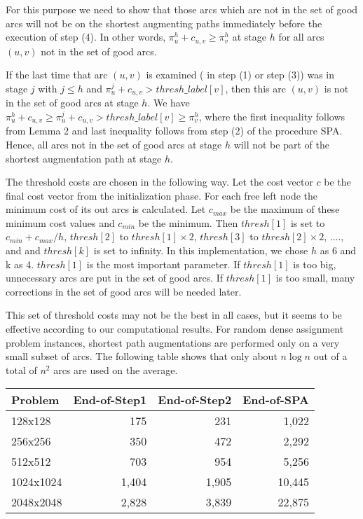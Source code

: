 For this purpose we need to show that those arcs which are not in the
set of good arcs will not be on the shortest augmenting paths
immediately before the execution of step (4). In other words, $\pi^h_u
+ c_{u,v} \geq \pi^h_v$ at stage $h$ for all arcs $(u,v)$ not in the
set of good arcs.

If the last time that arc $(u,v)$ is examined ( in step (1) or step
(3)) was in stage $j$ with $j\leq h$ and $\pi^j_u + c_{u,v} >
thresh\_label[v]$, then this arc $(u,v)$ is not in the set of good
arcs at stage $h$. We have $\pi^h_u + c_{u,v} \geq \pi^j_u + c_{u,v} >
thresh\_label[v]\geq \pi^h_v$, where the first inequality follows from
Lemma 2 and last inequality follows from step (2) of the procedure
SPA.  Hence, all arcs not in the set of good arcs at stage $h$ will
not be part of the shortest augmentation path at stage $h$.  \bull
\vskip 2pt

The threshold costs are chosen in the following way.  Let the cost
vector $c$ be the final cost vector from the initialization phase.
For each free left node the minimum cost of its out arcs is
calculated.  Let $c_{max}$ be the maximum of these minimum cost
values and $c_{min}$ be the minimum. 
Then $thresh[1]$ is set to $c_{min} + c_{max}/h$, 
$thresh[2]$ to $thresh[1]\times 2$, 
$thresh[3]$ to $thresh[2]\times 2$, ...., and and $thresh[k]$ is set to 
infinity. In this implementation, we chose $h$ as 6 and k as 4.
$thresh[1]$ is the most important parameter. If $thresh[1]$ is too
big, unnecessary arcs are put in the set of good arcs. If $thresh[1]$
is too small, many corrections in the set of good arcs will be needed
later.

This set of threshold costs may not be the best in all cases, but it seems to
be effective according to our computational results.
For random dense assignment problem instances, shortest path augmentations
are performed only on a very small subset of arcs. The following table
shows that only about $n \log n$ out of a total of $n^2$ arcs are used on
the average.

\vskip 5pt
{\small
\begin{tabular}{|l|rrr|} \hline
Problem &End-of-Step1 &End-of-Step2 &End-of-SPA\\ \hline
128x128& 175& 231& 1,022\\ 
256x256& 350& 472& 2,292\\ 
512x512& 703& 954& 5,256\\ 
1024x1024& 1,404& 1,905& 10,445\\ 
2048x2048& 2,828& 3,839& 22,875\\ \hline
\end{tabular}
}

